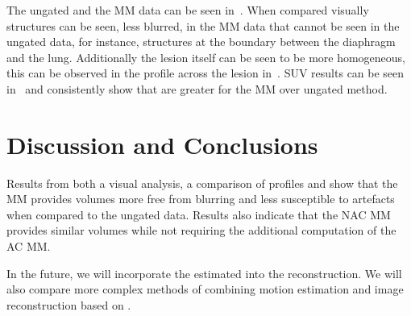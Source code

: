      The ungated and the \gls{MM} data can be seen in~. When compared visually structures can be seen, less blurred, in the \gls{MM} data that cannot be seen in the ungated data, for instance, structures at the boundary between the diaphragm and the lung. Additionally the lesion itself can be seen to be more homogeneous, this can be observed in the profile across the lesion in~. \gls{SUV} results can be seen in~ and consistently show that  are greater for the \gls{MM} over ungated method.

\vspace{-0.5cm}

\section{Discussion and Conclusions} \label{sec:discussion_and_conclusions}
    Results from both a visual analysis, a comparison of profiles and  show that the \gls{MM} provides volumes more free from blurring and less susceptible to artefacts when compared to the ungated data. Results also indicate that the \gls{NAC} \gls{MM} provides similar volumes while not requiring the additional computation of the \gls{AC} \gls{MM}.
    
    In the future, we will incorporate the estimated  into the reconstruction. We will also compare more complex methods of combining motion estimation and image reconstruction based on \cite{Bousse2016b}.
    